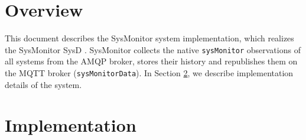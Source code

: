 \documentclass[a4paper]{arrowhead}
\begin{document}
\sloppy

\ArrowheadSetup

\begin{center}
  \vspace*{1cm}
  \huge{\arrowtitle}

  \vspace*{0.2cm}
  \LARGE{\arrowtype}
  \vspace*{1cm}

  \vspace*{\fill}


  \vspace*{1cm}
  \vspace*{\fill}

  \begin{abstract}
    This document describes the design and implementation of the SysMonitor support system of Arrowhead 5.2.2 (\texttt{ah5-SysMonitor-java-spring}).
  \end{abstract}

  \vspace*{1cm}
\end{center}

\newpage

\tableofcontents
\newpage

\section{Overview}
\label{sec:overview}

This document describes the SysMonitor system implementation, which realizes the SysMonitor SysD \cite{smo-sysd}. SysMonitor collects the native \texttt{sysMonitor} observations of all systems from the AMQP broker, stores their history and republishes them on the MQTT broker (\texttt{sysMonitorData}).
In Section \ref{Implementation}, we describe implementation details of the system.

\newpage

\section{Implementation}
\label{Implementation}
\end{document}
